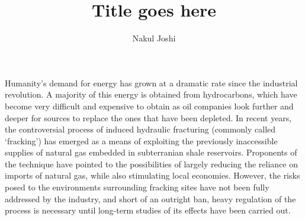 \documentclass[12pt]{article}
\title{Title goes here}
\author{Nakul Joshi}
\begin{document}
\maketitle

Humanity's demand for energy has grown at a dramatic rate since the industrial revolution. A majority of this energy is obtained from hydrocarbons, which have become very difficult and expensive to obtain as oil companies look further and deeper for sources to replace the ones that have been depleted. In recent years, the controversial process of induced hydraulic fracturing (commonly called `fracking') has emerged as a means of exploiting the previously inaccessible supplies of natural gas embedded in subterranian shale reservoirs. Proponents of the technique have pointed to the possibilities of largely reducing the reliance on imports of natural gas, while also stimulating local economies. However, the risks posed to the environments surrounding fracking sites have not been fully addressed by the industry, and short of an outright ban, heavy regulation of the process is necessary until long-term studies of its effects have been carried out.
\end{document}

